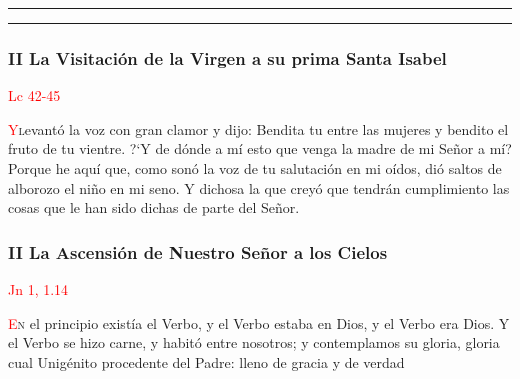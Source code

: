 \documentclass[10pt,twoside]{book}
\begin{document}
\begin{center}
      \rule{25em}{0.4pt}
\end{center}



\begin{center}
      \rule{25em}{0.4pt}
\end{center}

\begin{paracol}{2}
      \begin{leftcolumn}
            \noindent\subsubsection*{II La Visitación de la Virgen a su prima Santa Isabel}

            \vspace{-0.5em}

            \hfill\textcolor{red}{Lc 42-45}

            \lettrine[lines=2]{\textcolor{red}{Y}} levantó la voz con gran clamor y dijo: Bendita tu entre 
            las mujeres y bendito el fruto de tu vientre. {?`}Y de dónde a mí esto que venga la madre de mi Señor a mí? Porque he aquí que, 
            como sonó la voz de tu salutación en mi oídos, dió saltos de alborozo el niño en mi seno. Y dichosa la que creyó que tendrán
            cumplimiento las cosas que le han sido dichas de parte del Señor.
      \end{leftcolumn}
      \begin{rightcolumn}
            \noindent\subsubsection*{II La Ascensión de Nuestro Señor a los Cielos}

            \vspace{-0.5em}

            \hfill\textcolor{red}{Jn 1, 1.14}

            \lettrine[lines=2]{\textcolor{red}{E}}n el principio existía el Verbo, y el Verbo estaba en Dios, y el Verbo era Dios. Y el Verbo se hizo
            carne, y habitó entre nosotros; y contemplamos su gloria, gloria cual Unigénito procedente del Padre: lleno de gracia y de verdad
      \end{rightcolumn}
\end{paracol}


\end{document}
